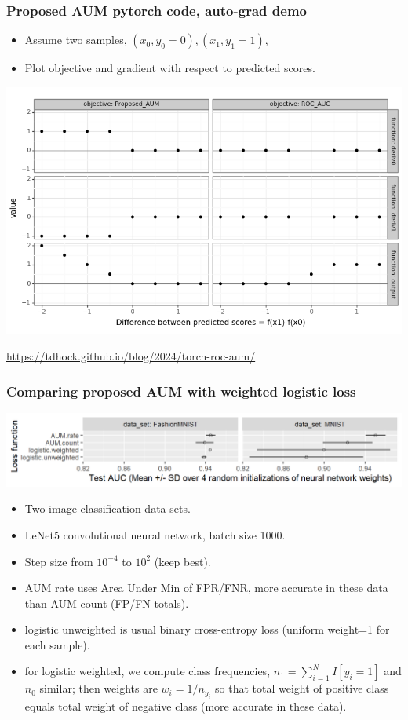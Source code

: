 \documentclass[t]{beamer}
\begin{document}
\begin{frame}[fragile]
  \frametitle{Proposed AUM pytorch code, auto-grad demo}

  \begin{itemize}
  \item Assume two samples, $(x_0,y_0=0), (x_1,y_1=1)$,
  \item Plot objective and gradient with respect to predicted scores.
  \end{itemize}

  \includegraphics[width=\textwidth]{gg_aum_grad}

  \url{https://tdhock.github.io/blog/2024/torch-roc-aum/}
\end{frame}

\begin{frame}
  \frametitle{Comparing proposed AUM with weighted logistic loss}
  \includegraphics[width=\textwidth]{figure-aum-neural-networks-test-auc}
  \begin{itemize}
  \item Two image classification data sets.
  \item LeNet5 convolutional neural network, batch size 1000.
  \item Step size from $10^{-4}$ to $10^2$ (keep best).
  \item AUM rate uses Area Under Min of FPR/FNR, more accurate in
    these data than AUM count (FP/FN totals).
  \item logistic unweighted is usual binary cross-entropy loss (uniform weight=1 for each sample). 
  \item for logistic weighted, we compute class frequencies, $n_1=\sum_{i=1}^N I[y_i=1]$ and $n_0$ similar; then weights are $w_i=1/n_{y_i}$ so that total weight of positive class equals total weight of negative class (more accurate in these data).
  \end{itemize}
\end{frame}
\end{document}
